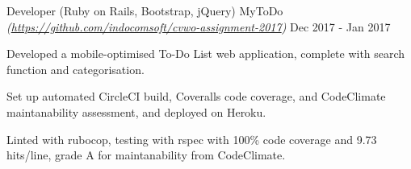 

\begin{cventries}

	\cventry
		{Developer (Ruby on Rails, Bootstrap, jQuery)} %
		{MyToDo \textmd{\em\tiny(\url{https://github.com/indocomsoft/cvwo-assignment-2017})}} %
		{} %
		{Dec 2017 - Jan 2017} %
		{
			\begin{cvitems} %
				\item {Developed a mobile-optimised To-Do List web application, complete with search function and categorisation.}
				\item {Set up automated CircleCI build, Coveralls code coverage, and CodeClimate maintanability assessment, and deployed on Heroku.}
				\item {Linted with rubocop, testing with rspec with 100\% code coverage and 9.73 hits/line, grade A for maintanability from CodeClimate.}
			\end{cvitems}
		}
		
    

\end{cventries}
